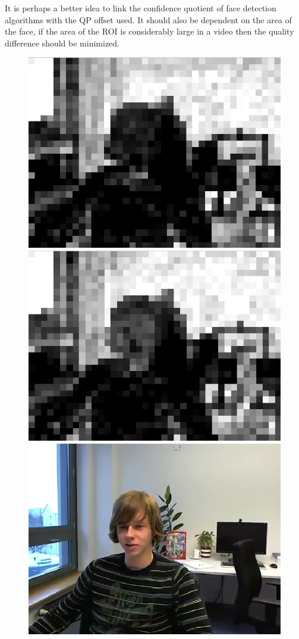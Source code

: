 \documentclass[11pt]{article} %
\begin{document}
It is perhaps a better idea to link the confidence quotient of face detection algorithms with the QP offset used. It should also be dependent on the area of the face, if the area of the ROI is considerably large in a video then the quality difference should be minimized. 
\begin{figure}[!h]
    \centering
    \includegraphics[scale=0.4]{PaulDefault120_91250kbps_psnr}
    \includegraphics[scale=0.4]{QPOffset/paul120_250kbps_QPoffset4_psnr}
    \includegraphics[scale=0.4]{PaulDefault120_91250kbps}

\end{figure}
\end{document}
